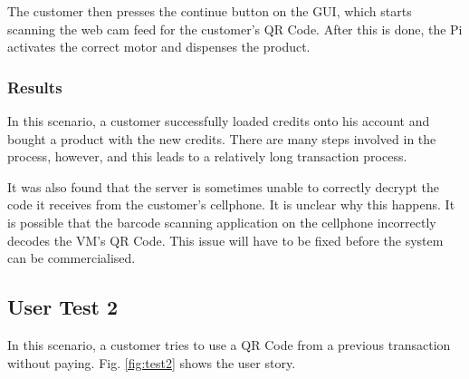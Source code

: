 The customer then presses the continue button on the GUI, which starts scanning the web
cam feed for the customer's QR Code. After this is done, the Pi activates the correct
motor and dispenses the product.

\subsubsection{Results}

In this scenario, a customer successfully loaded credits onto his account and bought a
product with the new credits. There are many steps involved in the process, however, and
this leads to a relatively long transaction process. 

It was also found that the server is sometimes unable to correctly decrypt the code it
receives from the customer's cellphone. It is unclear why this happens. It is
possible that the barcode scanning application on the cellphone incorrectly decodes the
VM's QR Code. This issue will have to be fixed before the system can be
commercialised.

\subsection{User Test 2}

In this scenario, a customer tries to use a QR Code from a previous transaction
without paying. Fig. \ref{fig:test2} shows the user story.

